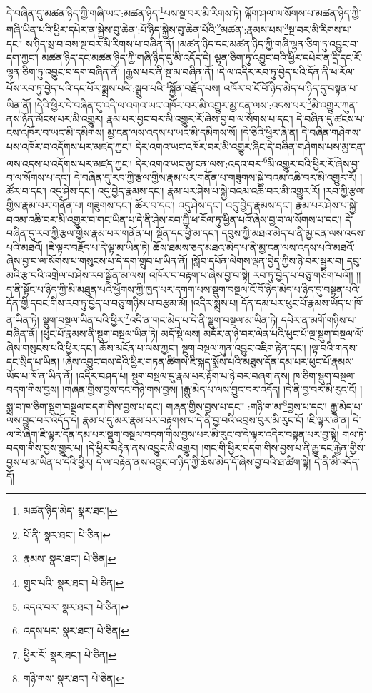 དེ་བཞིན་དུ་མཚན་ཉིད་ཀྱི་གཞི་ཡང་:མཚན་ཉིད་\footnote{མཚན་ཉིད་མེད་  སྣར་ཐང་། }པས་སྔ་བར་མི་རིགས་ཏེ། ལྐོག་ཤལ་ལ་སོགས་པ་མཚན་ཉིད་ཀྱི་གཞི་ཡིན་པའི་ཕྱིར་དཔེར་ན་སྐྱེས་བུ་ཆེན་:པོ་ཉིད་སྐྱེས་བུ་ཆེན་པོའི་\footnote{པོ་ནི་  སྣར་ཐང་།  པེ་ཅིན། }མཚན་:རྣམས་པས་\footnote{རྣམས་  སྣར་ཐང་།  པེ་ཅིན། }སྔ་བར་མི་རིགས་པ་དང་། ས་ཉིད་སྲ་བ་བས་སྔ་བར་མི་རིགས་པ་བཞིན་ནོ། །མཚན་ཉིད་དང་མཚན་ཉིད་ཀྱི་གཞི་ལྷན་ཅིག་ཏུ་འབྱུང་བ་དག་ཀྱང་། མཚན་ཉིད་དང་མཚན་ཉིད་ཀྱི་གཞི་ཉིད་དུ་མི་འདོད་དེ། ལྷན་ཅིག་ཏུ་འབྱུང་བའི་ཕྱིར་དཔེར་ན་དྲི་དང་རོ་ལྷན་ཅིག་ཏུ་འབྱུང་བ་དག་བཞིན་ནོ། །རྒྱས་པར་ནི་སྔ་མ་བཞིན་ནོ། །དེ་ལ་འདིར་རབ་ཏུ་བྱེད་པའི་དོན་ནི་ཕ་རོལ་པོས་རབ་ཏུ་བྱེད་པའི་དང་པོར་སྨྲས་པའི་:སྒྲུབ་པའི་\footnote{གྲུབ་པའི་  སྣར་ཐང་།  པེ་ཅིན། }སྐྱོན་བརྗོད་པས། འཁོར་བ་ངོ་བོ་ཉིད་མེད་པ་ཉིད་དུ་བསྟན་པ་ཡིན་ནོ། །དེའི་ཕྱིར་དེ་བཞིན་དུ་འདི་ལ་འགའ་ཡང་འཁོར་བར་མི་འགྱུར་མྱ་ངན་ལས་:འདས་པར་\footnote{འདའ་བར་  སྣར་ཐང་།  པེ་ཅིན། }མི་འགྱུར་ཀུན་ནས་ཉོན་མོངས་པར་མི་འགྱུར། རྣམ་པར་བྱང་བར་མི་འགྱུར་རོ་ཞེས་བྱ་བ་ལ་སོགས་པ་དང་། དེ་བཞིན་དུ་ཚངས་པ་ངས་འཁོར་བ་ཡང་མི་དམིགས། མྱ་ངན་ལས་འདས་པ་ཡང་མི་དམིགས་སོ། །དེ་ཅིའི་ཕྱིར་ཞེ་ན། དེ་བཞིན་གཤེགས་པས་འཁོར་བ་འདོགས་པར་མཛད་ཀྱང་། དེར་འགའ་ཡང་འཁོར་བར་མི་འགྱུར་ཞིང་དེ་བཞིན་གཤེགས་པས་མྱ་ངན་ལས་འདས་པ་འདོགས་པར་མཛད་ཀྱང་། དེར་འགའ་ཡང་མྱ་ངན་ལས་:འདའ་བར་\footnote{འདས་པར་  སྣར་ཐང་།  པེ་ཅིན། }མི་འགྱུར་བའི་ཕྱིར་རོ་ཞེས་བྱ་བ་ལ་སོགས་པ་དང་། དེ་བཞིན་དུ་རབ་ཀྱི་རྩལ་གྱིས་རྣམ་པར་གནོན་པ་གཟུགས་སྐྱེ་བའམ་འཆི་བར་མི་འགྱུར་རོ། །ཚོར་བ་དང་། འདུ་ཤེས་དང་། འདུ་བྱེད་རྣམས་དང་། རྣམ་པར་ཤེས་པ་སྐྱེ་བའམ་འཆི་བར་མི་འགྱུར་རོ། །རབ་ཀྱི་རྩལ་གྱིས་རྣམ་པར་གནོན་པ། གཟུགས་དང་། ཚོར་བ་དང་། འདུ་ཤེས་དང་། འདུ་བྱེད་རྣམས་དང་། རྣམ་པར་ཤེས་པ་སྐྱེ་བའམ་འཆི་བར་མི་འགྱུར་བ་གང་ཡིན་པ་དེ་ནི་ཤེས་རབ་ཀྱི་ཕ་རོལ་ཏུ་ཕྱིན་པའོ་ཞེས་བྱ་བ་ལ་སོགས་པ་དང་། དེ་བཞིན་དུ་རབ་ཀྱི་རྩལ་གྱིས་རྣམ་པར་གནོན་པ། སྔོན་དང་ཕྱི་མ་དང་། དབུས་ཀྱི་མཐའ་མེད་པ་ནི་མྱ་ངན་ལས་འདས་པའི་མཐའོ། །ཇི་ལྟར་བརྗོད་པ་དེ་ལྟ་མ་ཡིན་ཏེ། ཆོས་ཐམས་ཅད་མཐའ་མེད་པ་ནི་མྱ་ངན་ལས་འདས་པའི་མཐའོ་ཞེས་བྱ་བ་ལ་སོགས་པ་གསུངས་པ་དེ་དག་གྲུབ་པ་ཡིན་ནོ། །སློབ་དཔོན་ལེགས་ལྡན་བྱེད་ཀྱིས་ཉེ་བར་སྦྱར་བ། དབུ་མའི་རྩ་བའི་འགྲེལ་པ་ཤེས་རབ་སྒྲོན་མ་ལས། འཁོར་བ་བརྟག་པ་ཞེས་བྱ་བ་སྟེ། རབ་ཏུ་བྱེད་པ་བཅུ་གཅིག་པའོ།། །།ད་ནི་སྟོང་པ་ཉིད་ཀྱི་མི་མཐུན་པའི་ཕྱོགས་ཀྱི་ཁྱད་པར་དགག་པས་སྡུག་བསྔལ་ངོ་བོ་ཉིད་མེད་པ་ཉིད་དུ་བསྟན་པའི་དོན་གྱི་དབང་གིས་རབ་ཏུ་བྱེད་པ་བཅུ་གཉིས་པ་བརྩམ་མོ། །འདིར་སྨྲས་པ། དོན་དམ་པར་ཕུང་པོ་རྣམས་ཡོད་པ་ཁོ་ན་ཡིན་ཏེ། སྡུག་བསྔལ་ཡིན་པའི་ཕྱིར་\footnote{ཕྱིར་རོ་  སྣར་ཐང་།  པེ་ཅིན། }འདི་ན་གང་མེད་པ་དེ་ནི་སྡུག་བསྔལ་མ་ཡིན་ཏེ། དཔེར་ན་མགོ་གཉིས་པ་བཞིན་ནོ། །ཕུང་པོ་རྣམས་ནི་སྡུག་བསྔལ་ཡིན་ཏེ། མདོ་སྡེ་ལས། མདོར་ན་ཉེ་བར་ལེན་པའི་ཕུང་པོ་ལྔ་སྡུག་བསྔལ་ལོ་ཞེས་གསུངས་པའི་ཕྱིར་དང་། ཆོས་མངོན་པ་ལས་ཀྱང་། སྡུག་བསྔལ་ཀུན་འབྱུང་འཇིག་རྟེན་དང་། །ལྟ་བའི་གནས་དང་སྲིད་པ་ཡིན། །ཞེས་འབྱུང་བས་དེའི་ཕྱིར་གཏན་ཚིགས་ཇི་སྐད་སྨོས་པའི་མཐུས་དོན་དམ་པར་ཕུང་པོ་རྣམས་ཡོད་པ་ཁོ་ན་ཡིན་ནོ། །འདིར་བཤད་པ། སྡུག་བསྔལ་དུ་རྣམ་པར་རྟོག་པ་ཉེ་བར་བཞག་ནས། ཁ་ཅིག་སྡུག་བསྔལ་བདག་གིས་བྱས། །གཞན་གྱིས་བྱས་དང་གཉི་གས་བྱས། །རྒྱུ་མེད་པ་ལས་བྱུང་བར་འདོད། །དེ་ནི་བྱ་བར་མི་རུང་ངོ། །སྨྲ་བ་ཁ་ཅིག་སྡུག་བསྔལ་བདག་གིས་བྱས་པ་དང་། གཞན་གྱིས་བྱས་པ་དང་། :གཉི་ག་མ་\footnote{གཉི་གས་  སྣར་ཐང་།  པེ་ཅིན། }བྱས་པ་དང་། རྒྱུ་མེད་པ་ལས་བྱུང་བར་འདོད་དེ། རྣམ་པ་དུ་མར་རྣམ་པར་བརྟགས་པ་དེ་ནི་བྱ་བའི་འབྲས་བུར་མི་རུང་ངོ། །ཇི་ལྟར་ཞེ་ན། དེ་ལ་རེ་ཞིག་ཇི་ལྟར་དོན་དམ་པར་སྡུག་བསྔལ་བདག་གིས་བྱས་པར་མི་རུང་བ་དེ་ལྟར་འདིར་བསྟན་པར་བྱ་སྟེ། གལ་ཏེ་བདག་གིས་བྱས་གྱུར་པ། །དེ་ཕྱིར་བརྟེན་ནས་འབྱུང་མི་འགྱུར། །གང་གི་ཕྱིར་བདག་གིས་བྱས་པ་ནི་རྒྱུ་དང་རྐྱེན་གྱིས་བྱས་པ་མ་ཡིན་པ་དེའི་ཕྱིར། དེ་ལ་བརྟེན་ནས་འབྱུང་བ་ཉིད་ཀྱི་ཆོས་མེད་དོ་ཞེས་བྱ་བའི་ཐ་ཚིག་སྟེ། དེ་ནི་མི་འདོད་དོ། 
